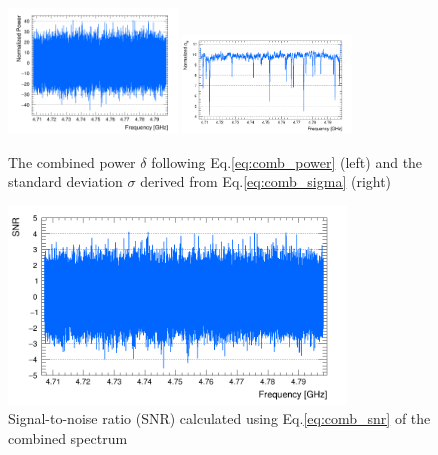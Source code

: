 \begin{figure}[h]
    \centering
    \includegraphics[width=0.4\textwidth,height = 0.3\textwidth]{figures/Power_CombSpectrum_AxionRun_AllSteps_Rescan_SG4_W201_LqWeight.png}
    \includegraphics[width=0.4\textwidth,height = 0.3\textwidth]{figures/Sigma_CombSpectrum_AxionRun_AllSteps_Rescan_SG4_W201_LqWeight.png}
    \caption{The combined power $\delta$ following Eq.\eqref{eq:comb_power} (left) and the standard deviation $\sigma$ derived from Eq.\eqref{eq:comb_sigma} (right)}
    \label{fig:power_sigma_comb}
\end{figure}

\begin{figure}[hbt!]
    \centering
    \includegraphics[width=0.8\textwidth,height=0.4\textwidth]{figures/SNR_CombSpectrum_AxionRun_AllSteps_Rescan_SG4_W201_LqWeight.png}
    \caption{Signal-to-noise ratio (SNR) calculated using Eq.\eqref{eq:comb_snr} of the combined spectrum }
    \label{fig:SNR_comb}
\end{figure}



